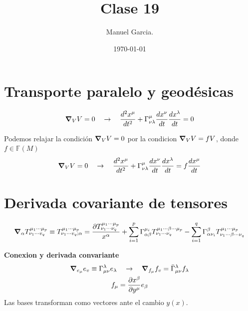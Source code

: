 \documentclass{article}
\title{Clase 19 }
\author{Manuel Garcia.}
\date{\today}
\newcommand{\caja}[3]{%
  \begin{tcolorbox}[colback=#1!5!white,colframe=#1!25!black,title=#2]
    #3
  \end{tcolorbox}%
}
\begin{document}
\maketitle

\section{Transporte paralelo y geodésicas }
\caja{red}{Ecuacion de las geodésicas }{
  \begin{gather*}
    \grad_V V = 0 \quad \rightarrow \quad \frac{d ^2 x^\mu  }{d t^2 } + \Gamma _{\nu \lambda } ^ {\mu } \frac{d x ^ {\nu } }{d t } \frac{d x ^ {\lambda} }{d t } = 0  
  \end{gather*}
}
Podemos relajar la condición $ \grad_V V = 0  $ por la condicion $ \grad _V V = fV  $, donde $ f \in \mathbb{F}(M)  $ 
\begin{gather*}
  \grad_V V = 0 \quad \rightarrow \quad \frac{d ^2 x^\mu  }{d t^2 } + \Gamma _{\nu \lambda } ^ {\mu } \frac{d x ^ {\nu } }{d t } \frac{d x ^ {\lambda} }{d t } = f \frac{d x ^ {\mu } }{d t }
\end{gather*}

\section{Derivada covariante de tensores }
\caja{red}{}{
  \begin{gather*}
    \grad _\alpha T _{\nu_1\cdots v_q } ^ {\mu_1 \cdots \mu_p } \equiv T _{\nu _1 \cdots v_q;\alpha }  ^ {\mu_1 \cdots \mu_p } = \frac{\partial T _{\nu_1 \cdots \nu_q } ^ {\mu_1 \cdots \mu_p }}{x ^ {\alpha}} + \displaystyle\sum_{i=1 }^{p } \Gamma _{\alpha\beta} ^ {\mu_i }T _{\nu_1 \cdots \nu_q } ^ {\mu_1 \cdots\beta \cdots  \mu_p } - \displaystyle\sum_{i=1 }^{q } \Gamma _{\alpha\nu_i } ^ {\beta} T _{\nu_1 \cdots \beta \cdots \nu_q } ^ {\mu_1 \cdots \mu_p }
  \end{gather*}
}
\textbf{Conexion y derivada convariante }
\begin{gather*}
  \grad _{e_\mu  } e_v \equiv \Gamma _{\mu \nu } ^ {\lambda} e _{\lambda}  \quad \rightarrow \quad \grad _{f _{\mu}  } f_v = \bar \Gamma _{\mu\nu } ^ {\lambda} f_\lambda \\
  f _{\mu } = \frac{\partial x ^ {\beta} }{\partial y ^ {\mu }} e _{\beta} 
\end{gather*}
Las bases transforman como vectores ante el cambio $ y(x)  $. 
\end{document}
